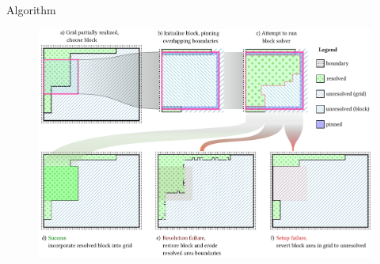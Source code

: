 \documentclass{beamer}
\begin{document}
  \begin{frame}[fragile]{Algorithm}
    \begin{figure}
      \includegraphics[width=\textwidth]{figs/poms_figalg.pdf}
    \end{figure}
  \end{frame}

%

%

%
%
%
\end{document}

